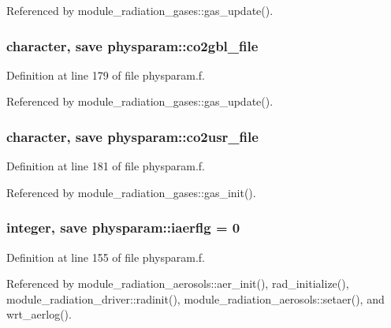 Referenced by module\+\_\+radiation\+\_\+gases\+::gas\+\_\+update().

\subsubsection[{\texorpdfstring{co2gbl\+\_\+file}{co2gbl_file}}]{\setlength{\rightskip}{0pt plus 5cm}character, save physparam\+::co2gbl\+\_\+file}\hypertarget{namespacephysparam_ad3e0f053cd067945bdc816b1a81a859a}{}\label{namespacephysparam_ad3e0f053cd067945bdc816b1a81a859a}


Definition at line 179 of file physparam.\+f.



Referenced by module\+\_\+radiation\+\_\+gases\+::gas\+\_\+update().

\subsubsection[{\texorpdfstring{co2usr\+\_\+file}{co2usr_file}}]{\setlength{\rightskip}{0pt plus 5cm}character, save physparam\+::co2usr\+\_\+file}\hypertarget{namespacephysparam_a2af9769060fccf9c42e14a30cf21c0aa}{}\label{namespacephysparam_a2af9769060fccf9c42e14a30cf21c0aa}


Definition at line 181 of file physparam.\+f.



Referenced by module\+\_\+radiation\+\_\+gases\+::gas\+\_\+init().

\subsubsection[{\texorpdfstring{iaerflg}{iaerflg}}]{\setlength{\rightskip}{0pt plus 5cm}integer, save physparam\+::iaerflg = 0}\hypertarget{namespacephysparam_a2b30f07ca3fb04fbfff8c01eb8082e8d}{}\label{namespacephysparam_a2b30f07ca3fb04fbfff8c01eb8082e8d}


Definition at line 155 of file physparam.\+f.



Referenced by module\+\_\+radiation\+\_\+aerosols\+::aer\+\_\+init(), rad\+\_\+initialize(), module\+\_\+radiation\+\_\+driver\+::radinit(), module\+\_\+radiation\+\_\+aerosols\+::setaer(), and wrt\+\_\+aerlog().

